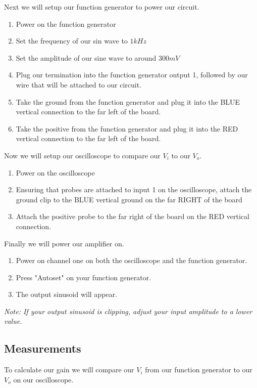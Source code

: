 \documentclass[12pt]{article}
\begin{document}
Next we will setup our function generator to power our circuit.

\begin{enumerate}
	\item Power on the function generator
	\item Set the frequency of our sin wave to $1kHz$
	\item Set the amplitude of our sine wave to around $300mV$
	\item Plug our termination into the function generator output 1, followed by our wire that will be attached to our circuit.
	\item Take the ground from the function generator and plug it into the BLUE vertical connection to the far left of the board.
	\item Take the positive from the function generator and plug it into the RED vertical connection to the far left of the board.
\end{enumerate}

Now we will setup our oscilloscope to compare our $V_i$ to our $V_o$.

\begin{enumerate}
	\item Power on the oscilloscope
	\item Ensuring that probes are attached to input 1 on the oscilloscope, attach the ground clip to the BLUE vertical ground on the far RIGHT of the board
	\item Attach the positive probe to the far right of the board on the RED vertical connection.
\end{enumerate}

Finally we will power our amplifier on.

\begin{enumerate}
	\item Power on channel one on both the oscilloscope and the function generator.
	\item Press "Autoset" on your function generator. 
	\item The output sinusoid will appear.
\end{enumerate}
\textit{Note: If your output sinusoid is clipping, adjust your input amplitude to a lower value.}

\newpage


\subsection{Measurements}
To calculate our gain we will compare our $V_i$ from our function generator to our $V_o$ on our oscilloscope.
\end{document}
